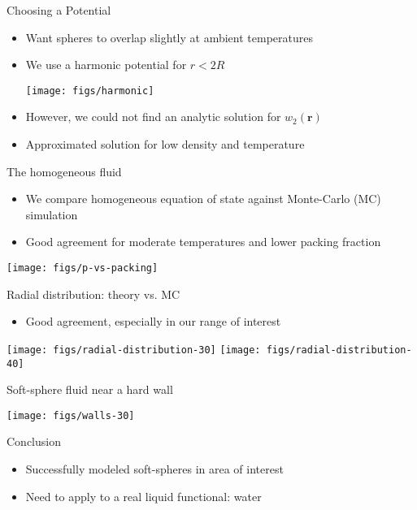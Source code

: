 \documentclass{beamer}
\newcommand{\rr}{\textbf{r}}
\begin{document}
\begin{frame}{Choosing a Potential}
 \begin{itemize}
   \item Want spheres to overlap slightly at ambient temperatures
   \item We use a harmonic potential for $r < 2R$
     \begin{center}
       \texttt{[image: figs/harmonic]}
     \end{center}
   \item However, we could not find an analytic solution for $w_2(\rr)$
   \item Approximated solution for low density and temperature
 \end{itemize}
\end{frame}

\begin{frame}{The homogeneous fluid}
  \begin{itemize}
    \item We compare homogeneous equation of state against Monte-Carlo
      (MC) simulation
    \item Good agreement for moderate temperatures and lower
      packing fraction
  \end{itemize}
  \begin{center}
    \texttt{[image: figs/p-vs-packing]}
  \end{center}
\end{frame}

\begin{frame}{Radial distribution: theory vs. MC}
  \begin{itemize}
  \item Good agreement, especially in our range of interest
  \end{itemize}
  \begin{center}
    \texttt{[image: figs/radial-distribution-30]}
    \texttt{[image: figs/radial-distribution-40]}
  \end{center}
\end{frame}

\begin{frame}{Soft-sphere fluid near a hard wall}
  \begin{center}
    \texttt{[image: figs/walls-30]}
  \end{center}
\end{frame}

\begin{frame}{Conclusion}
  \begin{itemize}
    \item Successfully modeled soft-spheres in area of interest
    \item Need to apply to a real liquid functional: water
  \end{itemize}
\end{frame}
\end{document}
